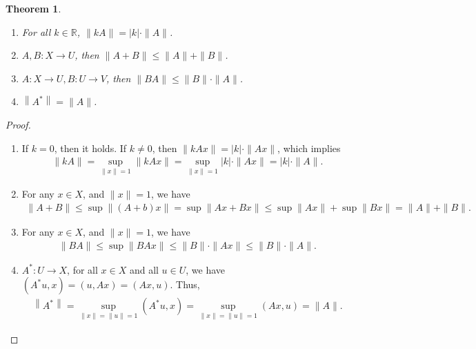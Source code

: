 \documentclass[11pt]{book}
\newtheorem{theorem}{Theorem}[section]
\theoremstyle{definition}
\numberwithin{equation}{chapter}
\begin{document}
\medskip

\begin{theorem}
~\begin{enumerate}[label=(\alph*)]
    \item For all $k\in\mathbb{R}$, $\|kA\| = |k|\cdot \|A\|$.
    \item $A,B:X\to U$, then $\|A + B\|\leq \|A\| + \|B\|$.
    \item $A:X\to U, B:U\to V$, then $\|BA\| \leq \|B\|\cdot \|A\|$.
    \item $\left\|A^*\right\| = \|A\|$.
\end{enumerate}
\end{theorem}
\begin{proof}
~\begin{enumerate}[label=(\alph*)]
    \item If $k = 0$, then it holds. If $k\neq 0$, then $\|kAx\| = |k| \cdot \|Ax\|$, which implies
    \begin{align*}
        \|kA\| = \sup_{\|x\|=1} \|kAx\| = \sup_{\|x\|=1} |k| \cdot \|Ax\| = |k|\cdot \|A\|.
    \end{align*}
    \item For any $x\in X$, and $\|x\| = 1$, we have 
    \begin{align*}
        \|A + B\| \leq \sup \|(A+b)x\|  = \sup \|Ax + Bx\| \leq \sup  \|Ax\| + \sup \|Bx\| = \|A\| + \|B\|.
    \end{align*}
    \item For any $x\in X$, and $\|x\| = 1$, we have 
    \begin{align*}
        \|BA\| \leq \sup\|BAx\|\leq \|B\|\cdot \|Ax\| \leq \|B\|\cdot \|A\|.
    \end{align*}
    \item $A^*:U\to X$, for all $x\in X$ and all $u\in U$, we have $(A^* u, x) = (u, Ax) = (Ax, u)$. Thus, 
    \begin{align*}
        \left\|A^*\right\| = \sup_{\|x\| = \|u\| = 1} (A^*u,x) = \sup_{\|x\| = \|u\| = 1} (Ax,u) = \|A\|.
    \end{align*}
\end{enumerate}
\end{proof}

\medskip
\end{document}
